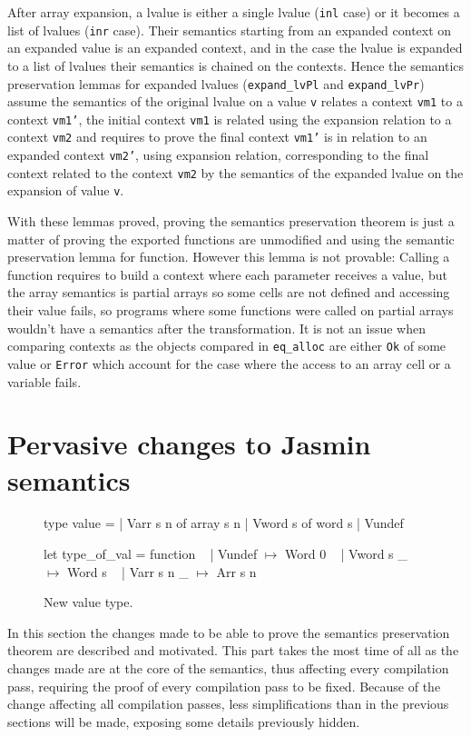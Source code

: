 \documentclass{article}
\begin{document}
After array expansion, a lvalue is either a single lvalue (\texttt{inl} case) or
it becomes a list of lvalues (\texttt{inr} case). Their semantics starting from
an expanded context on an expanded value is an expanded context, and in the case
the lvalue is expanded to a list of lvalues their semantics is chained on the
contexts. Hence the semantics preservation lemmas for expanded lvalues
(\texttt{expand\_lvPl} and \texttt{expand\_lvPr}) assume the semantics of the
original lvalue on a value \texttt{v} relates a context \texttt{vm1} to a
context \texttt{vm1'}, the initial context \texttt{vm1} is related using the
expansion relation to a context \texttt{vm2} and requires to prove the final
context \texttt{vm1'} is in relation to an expanded context \texttt{vm2'}, using
expansion relation, corresponding to the final context related to the context
\texttt{vm2} by the semantics of the expanded lvalue on the expansion of value
\texttt{v}.

\medskip

With these lemmas proved, proving the semantics preservation theorem is just a
matter of proving the exported functions are unmodified and using the semantic
preservation lemma for function. However this lemma is not provable: Calling a
function requires to build a context where each parameter receives a value, but
the array semantics is partial arrays so some cells are not defined and
accessing their value fails, so programs where some functions were called on
partial arrays wouldn't have a semantics after the transformation. It is not an
issue when comparing contexts as the objects compared in \texttt{eq\_alloc} are
either \texttt{Ok} of some value or \texttt{Error} which account for the case
where the access to an array cell or a variable fails.


\section{Pervasive changes to Jasmin semantics}\label{sec:perch}

\begin{figure}[t]
\obeylines\obeyspaces\ttfamily%
type value =
| Varr s n of array s n
| Vword s  of word  s
| Vundef

let type\_of\_val = function
~ | Vundef     \(\mapsto\) Word 0
~ | Vword s  \_ \(\mapsto\) Word s
~ | Varr s n \_ \(\mapsto\) Arr s n
\normalfont%
\caption{New value type.}\label{fig:newval}
\end{figure}

In this section the changes made to be able to prove the semantics preservation
theorem are described and motivated. This part takes the most time of all as the
changes made are at the core of the semantics, thus affecting every compilation
pass, requiring the proof of every compilation pass to be fixed. Because of the
change affecting all compilation passes, less simplifications than in the
previous sections will be made, exposing some details previously hidden.
\end{document}
